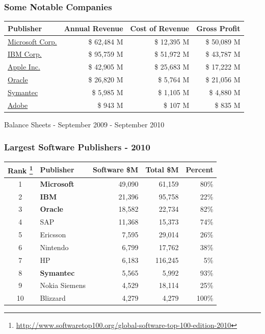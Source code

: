 \documentclass[18pt]{beamer}
\begin{document}
\begin{frame}
\frametitle{Some Notable Companies}

\begin{tabular}{lrrr}
\hline
\textbf{Publisher} &	\textbf{Annual Revenue} & \textbf{Cost of Revenue} & \textbf{Gross Profit} \\
\hline
\hline
\href{http://www.google.com/finance?fstype=ii\&q=NASDAQ:MSFT}{Microsoft Corp.}	& \$ 62,484 M & \$ 12,395 M  & \$ 50,089 M  \\
\hline
\href{http://www.google.com/finance?q=NYSE:IBM\&fstype=ii}{IBM Corp.} & \$ 95,759 M & \$ 51,972 M & \$ 43,787 M \\
\hline
\href{http://www.google.com/finance?q=NASDAQ:AAPL\&fstype=ii}{Apple Inc.} & \$ 42,905 M & \$ 25,683 M & \$ 17,222 M \\
\hline
\href{http://www.google.com/finance?q=NASDAQ:ORCL\&fstype=ii}{Oracle} & \$ 26,820 M & \$ 5,764 M & \$ 21,056 M \\
\hline
\href{http://www.google.com/finance?q=NASDAQ:SYMC\&fstype=ii}{Symantec}	&	\$ 5,985 M & \$ 1,105 M & \$ 4,880 M \\
\hline
\href{http://www.google.com/finance?q=NASDAQ:ADBE\&fstype=ii}{Adobe} & \$ 943 M & \$ 107 M & \$ 835 M \\
\hline
\end{tabular}

\bigskip
\begin{center}
Balance Sheets - September 2009 - September 2010
\end{center}

\end{frame}


{
\begin{frame}
\frametitle{Largest Software Publishers - 2010}

\begin{center}
\begin{tabular}{clrrr}
\hline
  \textbf{Rank
\footnote{
\url{http://www.softwaretop100.org/global-software-top-100-edition-2010}}
} &\textbf{Publisher} &	\textbf{Software \$M} & \textbf{Total \$M} & \textbf{Percent} \\
\hline
\hline
1 &  \textbf{Microsoft} & 49,090  & 61,159 &  80\% \\
2 &  \textbf{IBM} & 21,396  & 95,758  & 22\% \\
3 &  \textbf{Oracle} & 18,582  & 22,734 &  82\% \\
4 &  SAP & 11,368  & 15,373 &  74\% \\
5 &  Ericsson & 7,595  & 29,014 &  26\% \\
6 &  Nintendo & 6,799  &  17,762 &  38\% \\
7 &  HP & 6,183  &  116,245 &  5\% \\
8 &  \textbf{Symantec} & 5,565  & 5,992 &  93\% \\
9 &  Nokia Siemens & 4,529  &  18,114 &  25\% \\
10&  Blizzard & 4,279  & 4,279 & 100\% \\
\end{tabular}

\end{center}
\end{frame}
}
\end{document}
